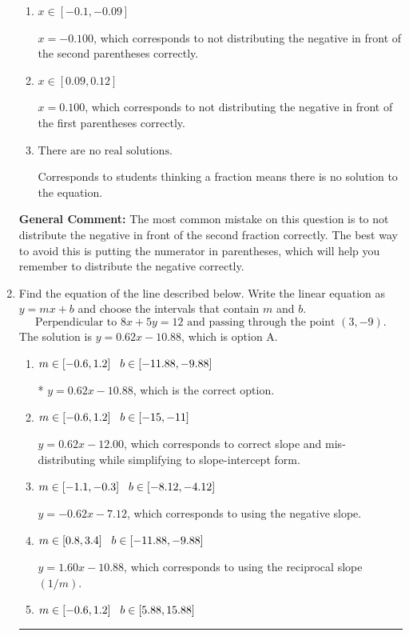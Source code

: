 \documentclass{extbook}[14pt]
\newcommand{\litem}[1]{\item #1

\rule{\textwidth}{0.4pt}}
\begin{document}
\begin{enumerate}
{\begin{enumerate}[label=\Alph*.]
* $x = -0.362$, which is the correct option.
\item \( x \in [-0.1, -0.09] \)

$x = -0.100$, which corresponds to not distributing the negative in front of the second parentheses correctly.
\item \( x \in [0.09, 0.12] \)

$x = 0.100$, which corresponds to not distributing the negative in front of the first parentheses correctly.
\item \( \text{There are no real solutions.} \)

Corresponds to students thinking a fraction means there is no solution to the equation.
\end{enumerate}

\textbf{General Comment:} The most common mistake on this question is to not distribute the negative in front of the second fraction correctly. The best way to avoid this is putting the numerator in parentheses, which will help you remember to distribute the negative correctly.
}
\litem{
Find the equation of the line described below. Write the linear equation as $ y=mx+b $ and choose the intervals that contain $m$ and $b$.
\[ \text{Perpendicular to } 8 x + 5 y = 12 \text{ and passing through the point } (3, -9). \]The solution is \( y = 0.62x - 10.88 \), which is option A.\begin{enumerate}[label=\Alph*.]
\item \( m \in [-0.6, 1.2] \hspace*{3mm} b \in [-11.88, -9.88] \)

* $y = 0.62x - 10.88$, which is the correct option.
\item \( m \in [-0.6, 1.2] \hspace*{3mm} b \in [-15, -11] \)

 $y = 0.62x - 12.00$, which corresponds to correct slope and mis-distributing while simplifying to slope-intercept form.
\item \( m \in [-1.1, -0.3] \hspace*{3mm} b \in [-8.12, -4.12] \)

 $y = -0.62x - 7.12$, which corresponds to using the negative slope.
\item \( m \in [0.8, 3.4] \hspace*{3mm} b \in [-11.88, -9.88] \)

 $y = 1.60x - 10.88$, which corresponds to using the reciprocal slope $(1/m)$.
\item \( m \in [-0.6, 1.2] \hspace*{3mm} b \in [5.88, 15.88] \)


\end{enumerate}}
\end{enumerate}
\end{document}
